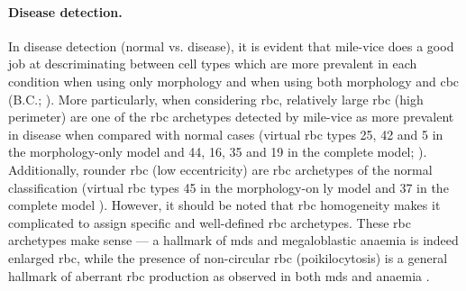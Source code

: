 \paragraph{Disease detection.} In disease detection (normal vs. disease), it is evident that \ac{mile-vice} does a good job at descriminating between cell types which are more prevalent in each condition when using only morphology and when using both morphology and \ac{cbc} (B.C.; ). More particularly, when considering \ac{rbc}, relatively large \ac{rbc} (high perimeter) are one of the \ac{rbc} archetypes detected by \ac{mile-vice} as more prevalent in disease when compared with normal cases (virtual \ac{rbc} types 25, 42 and 5 in the morphology-only model and 44, 16, 35 and 19 in the complete model; ). Additionally, rounder \ac{rbc} (low eccentricity) are \ac{rbc} archetypes of the normal classification (virtual \ac{rbc} types 45 in the morphology-on ly model and 37 in the complete model ). However, it should be noted that \ac{rbc} homogeneity makes it complicated to assign specific and well-defined \ac{rbc} archetypes. These \ac{rbc} archetypes make sense --- a hallmark of \ac{mds} and megaloblastic anaemia is indeed enlarged \ac{rbc}, while the presence of non-circular \ac{rbc} (poikilocytosis) is a general hallmark of aberrant \ac{rbc} production as observed in both \ac{mds} and anaemia \cite{Ford2013-nd}. 

\begin{figure}[!ht]
    \label{fig:mile-vice-vcq-so-disease-detection}
\end{figure}

\begin{figure}[!ht]
    \label{fig:rbc-disease-detection-examples}
\end{figure}


